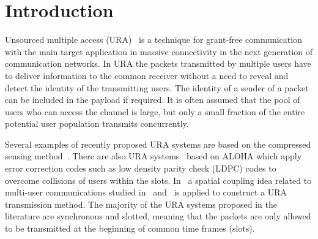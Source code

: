 \documentclass[journal,onecolumn,12pt]{IEEEtran}
\begin{document}
\begin{abstract}
 In this work we propose an approach to construct a fully asynchronous unsourced random access communications (URA) system. Besides the common URA features such as the absence of the user identification information in the packet and the decoding oriented to receiving the content of the messages, there is no limitation on the user transmission timing. The active users can transmit their packet any time on demand. The proposed system belongs to the class of preamble-payload URA formats. Contrary to the typical role of the preamble to serve as a temporary user identification, the preamble serves for the purpose of timing acquisition.  The proposed system also employs a very small pool of preambles to resolve collisions of packets transmitted simultaneously. We provide a performance analysis and simulation results for the proposed system and demonstrate that for a wide range of signal-to-noise ratios (SNR)s the supported numbers of active users are close to the numbers of users supported by a slotted URA system counterpart.
\end{abstract}

\section{Introduction}

Unsourced multiple access (URA)~\cite{Pol17} is a technique for grant-free communication with the main target application in massive connectivity in the next generation of communication networks. In URA the packets transmitted by multiple users have to deliver information to the common receiver without a need to reveal and detect the identity of the transmitting users. The identity of a sender of a packet can be included in the payload if required. It is often assumed that the pool of users who can access the channel is large, but only a small fraction of the entire potential user population transmits concurrently. 

Several examples of recently proposed URA systems are based on the compressed sensing method~\cite{OP17,FenglerC19}. There are also URA systems~\cite{KAFP20,AMF20} based on ALOHA which apply error correction codes such as low density parity check (LDPC) codes to overcome collisions of users within the slots. In~\cite{TBKN20} a spatial coupling idea related to multi-user communications studied in~\cite{KT19} and~\cite{TS19} is applied to construct a URA transmission method. %
The majority of the URA systems proposed in the literature are synchronous and slotted, meaning that the packets are only allowed to be transmitted at the beginning of common time frames (slots).
\end{document}
